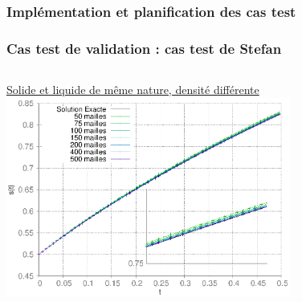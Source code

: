 \documentclass{beamer}
\begin{document}
\begin{frame}
	\frametitle{Implémentation et planification des cas test}
	
\end{frame}



\begin{frame}
    \frametitle{Cas test de validation : cas test de Stefan}
	\scriptsize

\begin{columns}
\begin{column}{0.5 \textwidth}
\underline{Solide et liquide de même nature, densité différente}
        \includegraphics[width=0.7\textwidth]{Figures/StefanConvDX.eps}	



\end{column}
\end{columns}
\end{frame}
\end{document}
